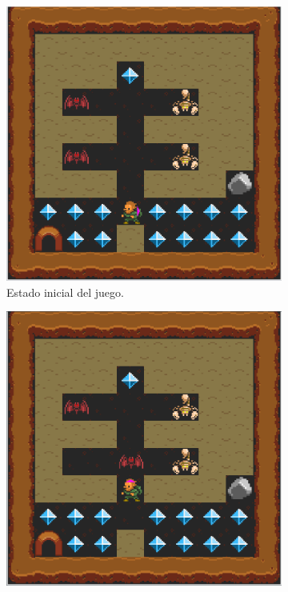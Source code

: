 \begin{figure}[H]
    \centering
    \begin{subfigure}[t]{0.32\textwidth}
        \centering
        \includegraphics[scale=0.2]{img/CH08/discrepancy_1.png}
        \caption{Estado inicial del juego.}
        \label{fig:discrepancy_1}
    \end{subfigure}%
    \begin{subfigure}[t]{0.32\textwidth}
        \centering
        \includegraphics[scale=0.2]{img/CH08/discrepancy_2.png}

\end{subfigure}
\end{figure}
